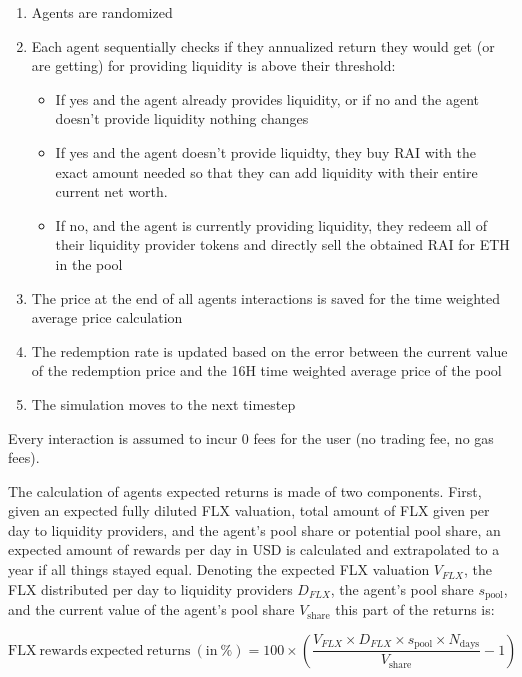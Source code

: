 \documentclass{article}
\begin{document}
    \begin{enumerate}
      \item Agents are randomized
      \item Each agent sequentially checks if they annualized return they would get (or are getting) for providing liquidity is above their threshold:
        \begin{itemize}
          \item If yes and the agent already provides liquidity, or if no and the agent doesn't provide liquidity nothing changes
          \item If yes and the agent doesn't provide liquidty, they buy RAI with the exact amount needed so that they can add liquidity with their entire current net worth. 
          \item If no, and the agent is currently providing liquidity, they redeem all of their liquidity provider tokens and directly sell the obtained RAI for ETH in the pool
        \end{itemize}
      \item The price at the end of all agents interactions is saved for the time weighted average price calculation
      \item The redemption rate is updated based on the error between the current value of the redemption price and the 16H time weighted average price of the pool
      \item The simulation moves to the next timestep
    \end{enumerate}
    
    Every interaction is assumed to incur 0 fees for the user (no trading fee, no gas fees).
    
    The calculation of agents expected returns is made of two components. First, given an expected fully diluted FLX valuation, total amount of FLX given per day to liquidity providers, and the agent's pool share or potential pool share, an expected amount of rewards per day in USD is calculated and extrapolated to a year if all things stayed equal. Denoting the expected FLX valuation $V_{FLX}$, the FLX distributed per day to liquidity providers $D_{FLX}$, the agent's pool share $s_{\mathrm{pool}}$, and the current value of the agent's pool share $V_{\mathrm{share}}$ this part of the returns is: 
    
    \begin{equation*}
      \mathrm{FLX \ rewards \ expected \ returns \ (in \ \%)} =  100 \times \left( \frac{V_{FLX} \times D_{FLX} \times s_{\mathrm{pool}} \times N_{\mathrm{days}}}{V_{\mathrm{share}}} - 1 \right)
    \end{equation*}
    
\end{document}

